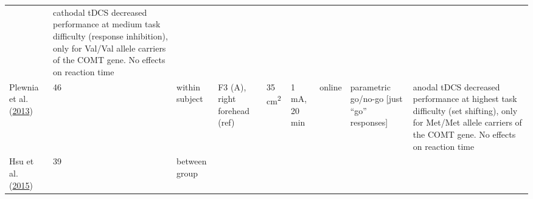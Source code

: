 \documentclass[11pt,]{memoir}
\begin{document}
\begin{longtable}[]{@{}lllllllll@{}}
\begin{minipage}[t]{0.12\columnwidth}
\end{minipage} & \begin{minipage}[t]{0.25\columnwidth}\raggedright
cathodal tDCS decreased performance at medium task
difficulty (response inhibition), only for Val/Val
allele carriers of the COMT gene. No effects on
reaction time\strut
\end{minipage}\tabularnewline
\begin{minipage}[t]{0.09\columnwidth}\raggedright
Plewnia et al. (\protect\hyperlink{ref-Plewnia2013}{2013})\strut
\end{minipage} & \begin{minipage}[t]{0.02\columnwidth}\raggedright
46\strut
\end{minipage} & \begin{minipage}[t]{0.04\columnwidth}\raggedright
within
subject\strut
\end{minipage} & \begin{minipage}[t]{0.10\columnwidth}\raggedright
F3 (A), right
forehead (ref)\strut
\end{minipage} & \begin{minipage}[t]{0.03\columnwidth}\raggedright
35
cm\textsuperscript{2}\strut
\end{minipage} & \begin{minipage}[t]{0.05\columnwidth}\raggedright
1 mA, 20
min\strut
\end{minipage} & \begin{minipage}[t]{0.06\columnwidth}\raggedright
online\strut
\end{minipage} & \begin{minipage}[t]{0.12\columnwidth}\raggedright
parametric go/no-go {[}just
``go'' responses{]}\strut
\end{minipage} & \begin{minipage}[t]{0.25\columnwidth}\raggedright
anodal tDCS decreased performance at highest task
difficulty (set shifting), only for Met/Met allele
carriers of the COMT gene. No effects on reaction time\strut
\end{minipage}\tabularnewline
\begin{minipage}[t]{0.09\columnwidth}\raggedright
Hsu et al. (\protect\hyperlink{ref-Hsu2015}{2015})\strut
\end{minipage} & \begin{minipage}[t]{0.02\columnwidth}\raggedright
39\strut
\end{minipage} & \begin{minipage}[t]{0.04\columnwidth}\raggedright
between
group\strut

\end{minipage}
\end{longtable}
\end{document}
